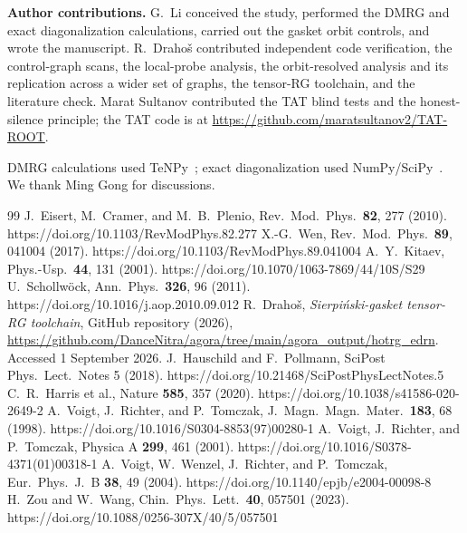 \documentclass[pdflatex,sn-mathphys-num,iicol]{sn-jnl}
\begin{document}
\textbf{Author contributions.} G.~Li conceived the study, performed the DMRG and exact diagonalization calculations, carried out the gasket orbit controls, and wrote the manuscript. R.~Draho\v{s} contributed independent code verification, the control-graph scans, the local-probe analysis, the orbit-resolved analysis and its replication across a wider set of graphs, the tensor-RG toolchain, and the literature check. Marat Sultanov contributed the TAT blind tests and the honest-silence principle; the TAT code is at \url{https://github.com/maratsultanov2/TAT-ROOT}.


DMRG calculations used TeNPy~\cite{Hauschild2018,Schollwock2011}; exact diagonalization used NumPy/SciPy~\cite{Harris2020}. We thank Ming Gong for discussions.

\begin{thebibliography}{99}
 J.~Eisert, M.~Cramer, and M.~B.~Plenio, Rev.\ Mod.\ Phys.\ \textbf{82}, 277 (2010). https://doi.org/10.1103/RevModPhys.82.277
 X.-G.~Wen, Rev.\ Mod.\ Phys.\ \textbf{89}, 041004 (2017). https://doi.org/10.1103/RevModPhys.89.041004
 A.~Y.~Kitaev, Phys.-Usp.\ \textbf{44}, 131 (2001). https://doi.org/10.1070/1063-7869/44/10S/S29
 U.~Schollw\"{o}ck, Ann.\ Phys.\ \textbf{326}, 96 (2011). https://doi.org/10.1016/j.aop.2010.09.012
 R.~Draho\v{s}, \emph{Sierpi\'{n}ski-gasket tensor-RG toolchain}, GitHub repository (2026), \url{https://github.com/DanceNitra/agora/tree/main/agora_output/hotrg_edrn}. Accessed 1 September 2026.
 J.~Hauschild and F.~Pollmann, SciPost Phys.\ Lect.\ Notes 5 (2018). https://doi.org/10.21468/SciPostPhysLectNotes.5
 C.~R.~Harris et al., Nature \textbf{585}, 357 (2020). https://doi.org/10.1038/s41586-020-2649-2
 A.~Voigt, J.~Richter, and P.~Tomczak, J.\ Magn.\ Magn.\ Mater.\ \textbf{183}, 68 (1998). https://doi.org/10.1016/S0304-8853(97)00280-1
 A.~Voigt, J.~Richter, and P.~Tomczak, Physica A \textbf{299}, 461 (2001). https://doi.org/10.1016/S0378-4371(01)00318-1
 A.~Voigt, W.~Wenzel, J.~Richter, and P.~Tomczak, Eur.\ Phys.\ J.\ B \textbf{38}, 49 (2004). https://doi.org/10.1140/epjb/e2004-00098-8
 H.~Zou and W.~Wang, Chin.\ Phys.\ Lett.\ \textbf{40}, 057501 (2023). https://doi.org/10.1088/0256-307X/40/5/057501
\end{thebibliography}
\end{document}
